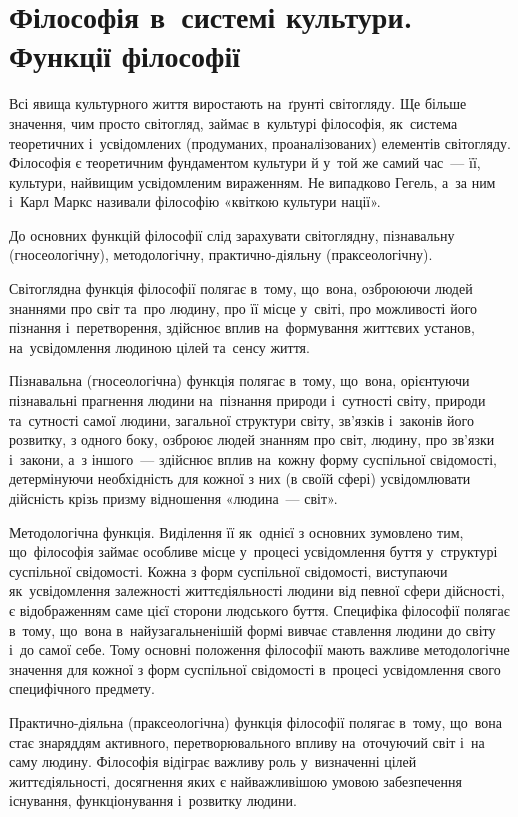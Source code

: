 \documentclass[a5paper,oneside,DIV=12,12pt,headings=small]{scrartcl}
\begin{document}
	\section{Філософія в~системі культури. Функції філософії}
		Всі явища культурного життя виростають на~ґрунті світогляду. Ще більше значення, чим просто світогляд, займає в~культурі філософія, як~система теоретичних і~усвідомлених (продуманих, проаналізованих) елементів світогляду. Філософія є теоретичним фундаментом культури й у~той же самий час~— її, культури, найвищим усвідомленим вираженням. Не випадково Гегель, а~за ним і~Карл Маркс називали філософію «квіткою культури нації».
		
		До основних функцій філософії слід зарахувати світоглядну, пізнавальну (гносеологічну), методологічну, практично-діяльну (праксеологічну).
		
		Світоглядна функція філософії полягає в~тому, що~вона, озброюючи людей знаннями про світ та~про людину, про її місце у~світі, про можливості його пізнання і~перетворення, здійснює вплив на~формування життєвих установ, на~усвідомлення людиною цілей та~сенсу життя.
		
		Пізнавальна (гносеологічна) функція полягає в~тому, що~вона, орієнтуючи пізнавальні прагнення людини на~пізнання природи і~сутності світу, природи та~сутності самої людини, загальної структури світу, зв'язків і~законів його розвитку, з одного боку, озброює людей знанням про світ, людину, про зв'язки і~закони, а~з іншого~— здійснює вплив на~кожну форму суспільної свідомості, детермінуючи необхідність для кожної з них (в своїй сфері) усвідомлювати дійсність крізь призму відношення «людина~— світ».
		
		Методологічна функція. Виділення її як~однієї з основних зумовлено тим, що~філософія займає особливе місце у~процесі усвідомлення буття у~структурі суспільної свідомості. Кожна з форм суспільної свідомості, виступаючи як~усвідомлення залежності життєдіяльності людини від певної сфери дійсності, є відображенням саме цієї сторони людського буття. Специфіка філософії полягає в~тому, що~вона в~найузагальненішій формі вивчає ставлення людини до світу і~до самої себе. Тому основні положення філософії мають важливе методологічне значення для кожної з форм суспільної свідомості в~процесі усвідомлення свого специфічного предмету.
		
		Практично-діяльна (праксеологічна) функція філософії полягає в~тому, що~вона стає знаряддям активного, перетворювального впливу на~оточуючий світ і~на саму людину. Філософія відіграє важливу роль у~визначенні цілей життєдіяльності, досягнення яких є найважливішою умовою забезпечення існування, функціонування і~розвитку людини.
		
\end{document}
